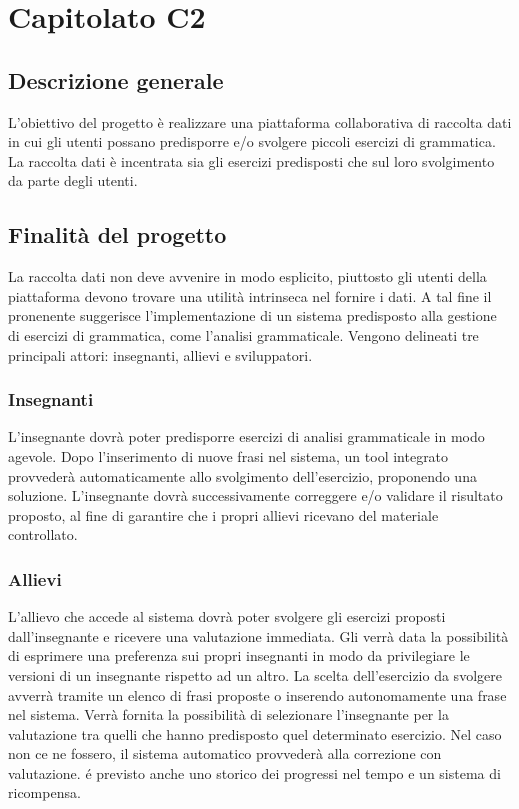 \section{Capitolato C2}
\subsection{Descrizione generale}
L’obiettivo del progetto è realizzare una piattaforma collaborativa di raccolta dati in cui gli utenti possano predisporre e/o svolgere piccoli esercizi di grammatica. La raccolta dati è incentrata sia gli esercizi predisposti che sul loro svolgimento da parte degli utenti.

\subsection{Finalità del progetto}
La raccolta dati non deve avvenire in
modo esplicito, piuttosto gli utenti della piattaforma devono trovare una utilità intrinseca nel fornire i dati. A tal fine il pronenente suggerisce l'implementazione di un sistema predisposto alla gestione di esercizi di grammatica, come l'analisi grammaticale. Vengono delineati tre principali attori: insegnanti, allievi e sviluppatori.
\subsubsection{Insegnanti}
L’insegnante dovrà poter predisporre esercizi di analisi grammaticale in modo agevole. Dopo l'inserimento di nuove frasi nel sistema, un tool integrato provvederà automaticamente allo svolgimento dell'esercizio, proponendo una soluzione. L'insegnante dovrà successivamente correggere e/o validare il risultato proposto, al fine di garantire che i propri allievi ricevano del materiale controllato.
\subsubsection{Allievi}
L’allievo che accede al sistema dovrà poter svolgere gli esercizi proposti dall’insegnante e ricevere una valutazione immediata. Gli verrà data la possibilità di esprimere una preferenza sui propri insegnanti in modo da privilegiare le versioni di un insegnante rispetto ad un altro. La scelta dell'esercizio da svolgere avverrà tramite un elenco di frasi proposte o inserendo autonomamente una frase nel sistema. Verrà fornita la possibilità di selezionare l'insegnante per la valutazione tra quelli che hanno predisposto quel determinato esercizio. Nel caso non ce ne fossero, il sistema automatico provvederà alla correzione con valutazione. é previsto anche uno storico dei progressi nel tempo e un sistema di ricompensa.
